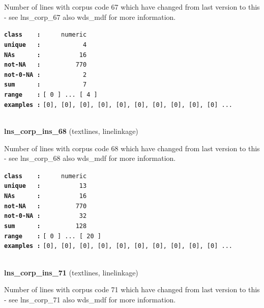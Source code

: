 \documentclass[]{article}
\begin{document}
Number of lines with corpus code 67 which have changed from last version
to this - see lns\_corp\_67 also wds\_mdf for more information.

\textbf{\texttt{class\ \ \ \ :}} \texttt{~~~~~numeric}\\
\textbf{\texttt{unique\ \ \ :}} \texttt{~~~~~~~~~~~4}\\
\textbf{\texttt{NAs\ \ \ \ \ \ :}} \texttt{~~~~~~~~~~16}\\
\textbf{\texttt{not-NA\ \ \ :}} \texttt{~~~~~~~~~770}\\
\textbf{\texttt{not-0-NA\ :}} \texttt{~~~~~~~~~~~2}\\
\textbf{\texttt{sum\ \ \ \ \ \ :}} \texttt{~~~~~~~~~~~7}\\
\textbf{\texttt{range\ \ \ \ :}}
\texttt{{[}\ 0\ {]}\ ...\ {[}\ 4\ {]}}\\
\textbf{\texttt{examples\ :}}
\texttt{{[}0{]},\ {[}0{]},\ {[}0{]},\ {[}0{]},\ {[}0{]},\ {[}0{]},\ {[}0{]},\ {[}0{]},\ {[}0{]},\ {[}0{]}\ ...}\\

~

\textbf{lns\_corp\_ins\_68} (textlines, linelinkage)

Number of lines with corpus code 68 which have changed from last version
to this - see lns\_corp\_68 also wds\_mdf for more information.

\textbf{\texttt{class\ \ \ \ :}} \texttt{~~~~~numeric}\\
\textbf{\texttt{unique\ \ \ :}} \texttt{~~~~~~~~~~13}\\
\textbf{\texttt{NAs\ \ \ \ \ \ :}} \texttt{~~~~~~~~~~16}\\
\textbf{\texttt{not-NA\ \ \ :}} \texttt{~~~~~~~~~770}\\
\textbf{\texttt{not-0-NA\ :}} \texttt{~~~~~~~~~~32}\\
\textbf{\texttt{sum\ \ \ \ \ \ :}} \texttt{~~~~~~~~~128}\\
\textbf{\texttt{range\ \ \ \ :}}
\texttt{{[}\ 0\ {]}\ ...\ {[}\ 20\ {]}}\\
\textbf{\texttt{examples\ :}}
\texttt{{[}0{]},\ {[}0{]},\ {[}0{]},\ {[}0{]},\ {[}0{]},\ {[}0{]},\ {[}0{]},\ {[}0{]},\ {[}0{]},\ {[}0{]}\ ...}\\

~

\textbf{lns\_corp\_ins\_71} (textlines, linelinkage)

Number of lines with corpus code 71 which have changed from last version
to this - see lns\_corp\_71 also wds\_mdf for more information.
\end{document}
